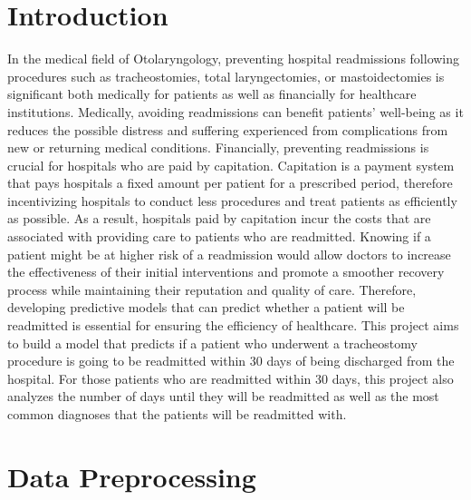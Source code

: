 \documentclass[sn-basic,pdflatex]{sn-jnl}
\theoremstyle{remark}
\theoremstyle{definition}
\begin{document}
\keywords{}



\maketitle

\hypertarget{sec1}{%
\section{Introduction}\label{sec1}}

In the medical field of Otolaryngology, preventing hospital readmissions
following procedures such as tracheostomies, total laryngectomies, or
mastoidectomies is significant both medically for patients as well as
financially for healthcare institutions. Medically, avoiding
readmissions can benefit patients' well-being as it reduces the possible
distress and suffering experienced from complications from new or
returning medical conditions. Financially, preventing readmissions is
crucial for hospitals who are paid by capitation. Capitation is a
payment system that pays hospitals a fixed amount per patient for a
prescribed period, therefore incentivizing hospitals to conduct less
procedures and treat patients as efficiently as possible. As a result,
hospitals paid by capitation incur the costs that are associated with
providing care to patients who are readmitted. Knowing if a patient
might be at higher risk of a readmission would allow doctors to increase
the effectiveness of their initial interventions and promote a smoother
recovery process while maintaining their reputation and quality of care.
Therefore, developing predictive models that can predict whether a
patient will be readmitted is essential for ensuring the efficiency of
healthcare. \newline \newline This project aims to build a model that
predicts if a patient who underwent a tracheostomy procedure is going to
be readmitted within 30 days of being discharged from the hospital. For
those patients who are readmitted within 30 days, this project also
analyzes the number of days until they will be readmitted as well as the
most common diagnoses that the patients will be readmitted with.

\hypertarget{sec2}{%
\section{Data Preprocessing}\label{sec2}}
\end{document}
